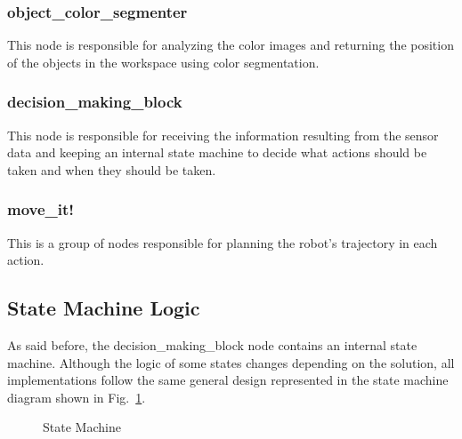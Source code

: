 \subsubsection{object\_color\_segmenter}

This node is responsible for analyzing the color images and returning the position of the objects in the workspace using color segmentation.

\subsubsection{decision\_making\_block}

This node is responsible for receiving the information resulting from the sensor data and keeping an internal state machine to decide what actions should be taken and when they should be taken.

\subsubsection{move\_it!}

This is a group of nodes responsible for planning the robot's trajectory in each action.

\subsection{State Machine Logic}

As said before, the decision\_making\_block node contains an internal state machine. Although the logic of some states changes depending on the solution, all implementations follow the same general design represented in the state machine diagram shown in Fig.~\ref{fig:state_machine}.

\begin{figure}[H]%
    \centering
    
    \caption{State Machine}
    \label{fig:state_machine}
\end{figure}

